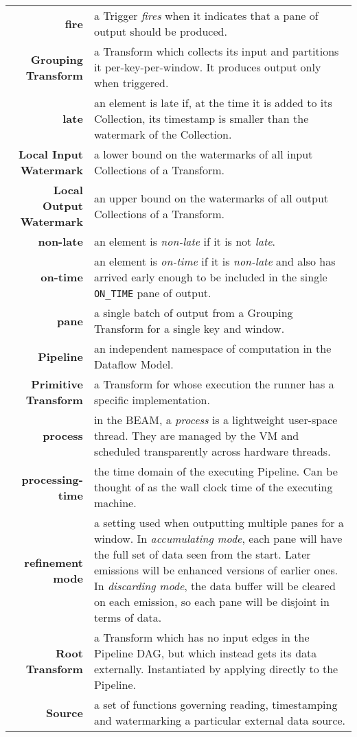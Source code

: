 {\begin{longtabu}{rX[p]}
	\textbf{fire} & a Trigger \emph{fires} when it indicates that a pane of output should be produced. \\
	\textbf{Grouping Transform} & a Transform which collects its input and partitions it per-key-per-window. It produces output only when triggered. \\
	\textbf{late} & an element is late if, at the time it is added to its Collection, its timestamp is smaller than the watermark of the Collection. \\
	\textbf{Local Input Watermark} & a lower bound on the watermarks of all input Collections of a Transform. \\
	\textbf{Local Output Watermark} & an upper bound on the watermarks of all output Collections of a Transform. \\
	\textbf{non-late} & an element is \emph{non-late} if it is not \emph{late}. \\
	\textbf{on-time} & an element is \emph{on-time} if it is \emph{non-late} and also has arrived early enough to be included in the single \texttt{ON\_TIME} pane of output. \\
	\textbf{pane} & a single batch of output from a Grouping Transform for a single key and window. \\
	\textbf{Pipeline} & an independent namespace of computation in the Dataflow Model. \\
	\textbf{Primitive Transform} & a Transform for whose execution the runner has a specific implementation. \\
	\textbf{process} & in the BEAM, a \emph{process} is a lightweight user-space thread. They are managed by the VM and scheduled transparently across hardware threads. \\
	\textbf{processing-time} & the time domain of the executing Pipeline. Can be thought of as the wall clock time of the executing machine. \\
	\textbf{refinement mode} & a setting used when outputting multiple panes for a window. In \emph{accumulating mode}, each pane will have the full set of data seen from the start. Later emissions will be enhanced versions of earlier ones. In \emph{discarding mode}, the data buffer will be cleared on each emission, so each pane will be disjoint in terms of data. \\
	\textbf{Root Transform} & a Transform which has no input edges in the Pipeline DAG, but which instead gets its data externally. Instantiated by applying directly to the Pipeline. \\
	\textbf{Source} & a set of functions governing reading, timestamping and watermarking a particular external data source. \\

\end{longtabu}}

